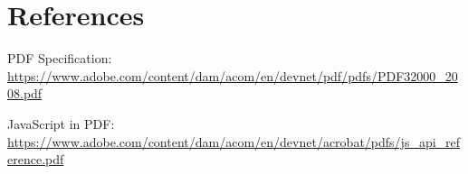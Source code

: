 \documentclass[a4paper,10pt]{article}
\begin{document}
\newpage
\section{References}

PDF Specification: \href{https://www.adobe.com/content/dam/acom/en/devnet/pdf/pdfs/PDF32000_2008.pdf}{\url{https://www.adobe.com/content/dam/acom/en/devnet/pdf/pdfs/PDF32000_2008.pdf}}

JavaScript in PDF: \href{https://www.adobe.com/content/dam/acom/en/devnet/acrobat/pdfs/js_api_reference.pdf}{\url{https://www.adobe.com/content/dam/acom/en/devnet/acrobat/pdfs/js_api_reference.pdf}}
\end{document}
